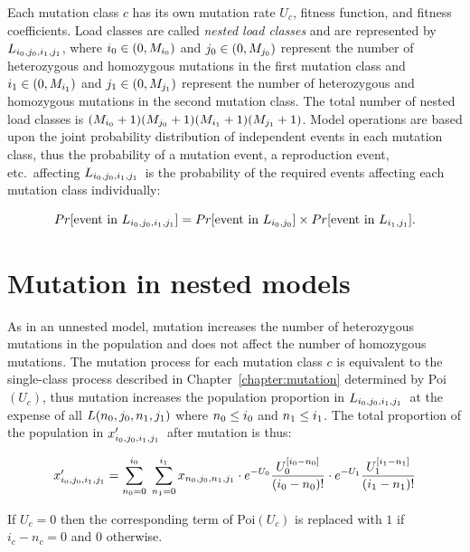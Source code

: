 \documentclass[12pt,twoside,letterpaper,fleqn]{report}
\numberwithin{equation}{section}  %
\newcommand{\ProbDist}[2]{\mbox{{#1}$(#2)$}}
\newcommand{\izero}{\mbox{$i_0$\/}}
\newcommand{\jzero}{\mbox{$j_0$\/}}
\newcommand{\ione}{\mbox{$i_1$\/}}
\newcommand{\jone}{\mbox{$j_1$\/}}
\newcommand{\nzero}{\mbox{$n_0$\/}}
\newcommand{\none}{\mbox{$n_1$\/}}
\newcommand{\Lijij}{\mbox{$L_{i_0\/,j_0\/,i_1\/,j_1\/}$}}
\newcommand{\Lijzero}{\mbox{$L_{i_0\/,j_0\/}$}}
\newcommand{\Lijone}{\mbox{$L_{i_1\/,j_1\/}$}}
\newcommand{\Mizero}{\mbox{$M_{i_0}$\/}}
\newcommand{\Mjzero}{\mbox{$M_{j_0}$\/}}
\newcommand{\Mione}{\mbox{$M_{i_1}$\/}}
\newcommand{\Mjone}{\mbox{$M_{j_1}$\/}}
\newcommand{\xpijij}{\mbox{$x'_{i_0\/,j_0\/,i_1\/,j_1\/}$}}
\begin{document}
{Each mutation class $c$ has its own mutation rate $U_c$, fitness function, and
fitness coefficients.  Load classes are called \emph{nested load classes} and
are represented by \Lijij, where $\izero\in(0,\Mizero)$ and
$\jzero\in(0,\Mjzero)$ represent the number of heterozygous and homozygous
mutations in the first mutation class and $\ione\in(0,\Mione)$ and
$\jone\in(0,\Mjone)$ represent the number of heterozygous and homozygous
mutations in the second mutation class.  The total number of nested load
classes is $(\Mizero+1)(\Mjzero+1)(\Mione+1)(\Mjone+1)$.  Model operations are
based upon the joint probability distribution of independent events in each
mutation class, thus the probability of a mutation event, a reproduction event,
etc.\ affecting \Lijij\ is the probability of the required events affecting
each mutation class individually:

\begin{equation}
Pr[\text{event in }\Lijij] = Pr[\text{event in }\Lijzero]\times Pr[\text{event in }\Lijone].
\end{equation}

\section{Mutation in nested models}

As in an unnested model, mutation increases the number of heterozygous
mutations in the population and does not affect the number of homozygous
mutations.  The mutation process for each mutation class $c$ is equivalent to
the single-class process described in Chapter~\ref{chapter:mutation} determined
by \ProbDist{Poi}{U_c}, thus mutation increases the population proportion in
\Lijij\ at the expense of all $L(\nzero,\jzero,\none,\jone)$ where
$\nzero\le\izero$ and $\none\le\ione$.  The total proportion of the population
in \xpijij\ after mutation is thus:

\begin{equation}\label{eq:nested:fullequation}
    \xpijij = \sum_{n_0=0}^{i_0}{\; \sum_{n_1=0}^{i_1}{x_{n_0,j_0,n_1,j_1} \cdot e^{-U_0} \frac{U_0^{[i_0-n_0]}}{(\izero-\nzero)!} \cdot e^{-U_1} \frac{U_1^{[i_1-n_1]}}{(\ione-\none)!}}}
\end{equation}

If $U_c=0$ then the corresponding term of \ProbDist{Poi}{U_c} is replaced with
$1$ if $i_c-n_c=0$ and $0$ otherwise.

}
\end{document}
